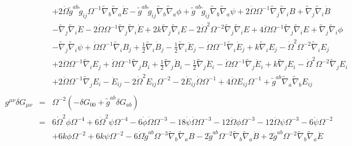 \documentclass[10pt,letterpaper]{article}
\numberwithin{equation}{section}
\begin{document}
\begin{eqnarray}
&& + 2 \dot{\Omega} \tilde{g}^{ab} \tilde{g}_{ij} \Omega^{-1} \tilde{\nabla}_{b}\tilde{\nabla}_{a}\dot{E}
-  \tilde{g}^{ab} \tilde{g}_{ij} \tilde{\nabla}_{b}\tilde{\nabla}_{a}\phi
+ \tilde{g}^{ab} \tilde{g}_{ij} \tilde{\nabla}_{b}\tilde{\nabla}_{a}\psi
+ 2 \dot{\Omega} \Omega^{-1} \tilde{\nabla}_{j}\tilde{\nabla}_{i}B
+ \tilde{\nabla}_{j}\tilde{\nabla}_{i}\dot{B}\nonumber\\
&& -  \tilde{\nabla}_{j}\tilde{\nabla}_{i}\ddot{E}
- 2 \dot{\Omega} \Omega^{-1} \tilde{\nabla}_{j}\tilde{\nabla}_{i}\dot{E}
+ 2 k \tilde{\nabla}_{j}\tilde{\nabla}_{i}E
- 2 \dot{\Omega}^2 \Omega^{-2} \tilde{\nabla}_{j}\tilde{\nabla}_{i}E
+ 4 \ddot{\Omega} \Omega^{-1} \tilde{\nabla}_{j}\tilde{\nabla}_{i}E
+ \tilde{\nabla}_{j}\tilde{\nabla}_{i}\phi\nonumber\\
&& -  \tilde{\nabla}_{j}\tilde{\nabla}_{i}\psi
%
+\dot{\Omega} \Omega^{-1} \tilde{\nabla}_{i}B_{j}
+ \tfrac{1}{2} \tilde{\nabla}_{i}\dot{B}_{j}
-  \tfrac{1}{2} \tilde{\nabla}_{i}\ddot{E}_{j}
-  \dot{\Omega} \Omega^{-1} \tilde{\nabla}_{i}\dot{E}_{j}
+ k \tilde{\nabla}_{i}E_{j}
-  \dot{\Omega}^2 \Omega^{-2} \tilde{\nabla}_{i}E_{j}
\nonumber\\
&&+ 2 \ddot{\Omega} \Omega^{-1} \tilde{\nabla}_{i}E_{j}
+ \dot{\Omega} \Omega^{-1} \tilde{\nabla}_{j}B_{i}
+ \tfrac{1}{2} \tilde{\nabla}_{j}\dot{B}_{i}
-  \tfrac{1}{2} \tilde{\nabla}_{j}\ddot{E}_{i}
-  \dot{\Omega} \Omega^{-1} \tilde{\nabla}_{j}\dot{E}_{i}
+ k \tilde{\nabla}_{j}E_{i}
-  \dot{\Omega}^2 \Omega^{-2} \tilde{\nabla}_{j}E_{i}
\nonumber\\
&& + 2 \ddot{\Omega} \Omega^{-1} \tilde{\nabla}_{j}E_{i}
%
- \ddot{E}_{ij}
- 2 \dot{\Omega}^2 E_{ij} \Omega^{-2}
- 2 \dot{E}_{ij} \dot{\Omega} \Omega^{-1}
+ 4 \ddot{\Omega} E_{ij} \Omega^{-1}
+ \tilde{g}^{ab} \tilde{\nabla}_{a}\tilde{\nabla}_{b}E_{ij}
\\ \nonumber\\
g^{\mu\nu}\delta G_{\mu\nu}&=& \Omega^{-2}(-\delta G_{00} + \tilde g^{ab}\delta G_{ab})
\nonumber\\
&=&6 \dot{\Omega}^2 \phi \Omega^{-4}
+ 6 \dot{\Omega}^2 \psi \Omega^{-4}
- 6 \dot{\phi} \dot{\Omega} \Omega^{-3}
- 18 \dot{\psi} \dot{\Omega} \Omega^{-3}
- 12 \ddot{\Omega} \phi \Omega^{-3}
- 12 \ddot{\Omega} \psi \Omega^{-3}
- 6 \ddot{\psi} \Omega^{-2}\nonumber\\
&& + 6 k \phi \Omega^{-2}
+ 6 k \psi \Omega^{-2}
- 6 \dot{\Omega} \tilde{g}^{ab} \Omega^{-3} \tilde{\nabla}_{b}\tilde{\nabla}_{a}B
- 2 \tilde{g}^{ab} \Omega^{-2} \tilde{\nabla}_{b}\tilde{\nabla}_{a}\dot{B}
+ 2 \tilde{g}^{ab} \Omega^{-2} \tilde{\nabla}_{b}\tilde{\nabla}_{a}\ddot{E}\nonumber\\

\end{eqnarray}
\end{document}
